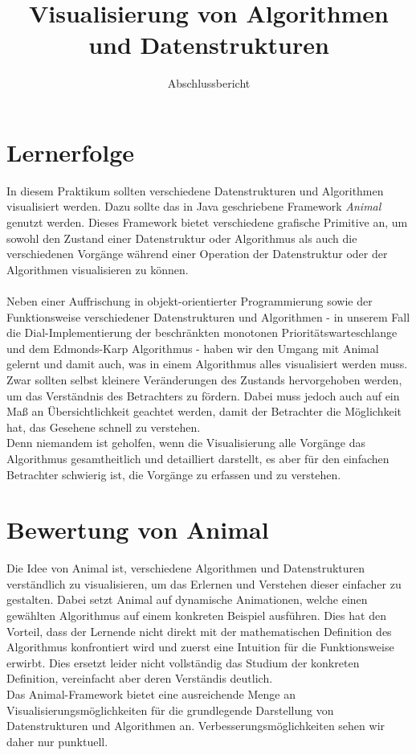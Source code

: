 \documentclass[nochapname]{tudexercise}
\title{Visualisierung von Algorithmen und Datenstrukturen}
\subtitle{Abschlussbericht}
\begin{document}
	\lstset{language=Java}
	\maketitle
	
	\section{Lernerfolge}
		In diesem Praktikum sollten verschiedene Datenstrukturen und Algorithmen visualisiert werden. Dazu sollte das in Java geschriebene Framework \textit{Animal} genutzt werden. Dieses Framework bietet verschiedene grafische Primitive an, um sowohl den Zustand einer Datenstruktur oder Algorithmus als auch die verschiedenen Vorgänge während einer Operation der Datenstruktur oder der Algorithmen visualisieren zu können.\\\\
		Neben einer Auffrischung in objekt-orientierter Programmierung sowie der Funktionsweise verschiedener Datenstrukturen und Algorithmen - in unserem Fall die Dial-Implementierung der beschränkten monotonen Prioritätswarteschlange und dem Edmonds-Karp Algorithmus - haben wir den Umgang mit Animal gelernt und damit auch, was in einem Algorithmus alles visualisiert werden muss. Zwar sollten selbst kleinere Veränderungen des Zustands hervorgehoben werden, um das Verständnis des Betrachters zu fördern. Dabei muss jedoch auch auf ein Maß an Übersichtlichkeit geachtet werden, damit der Betrachter die Möglichkeit hat, das Gesehene schnell zu verstehen.\\
		Denn niemandem ist geholfen, wenn die Visualisierung alle Vorgänge das Algorithmus gesamtheitlich und detailliert darstellt, es aber für den einfachen Betrachter schwierig ist, die Vorgänge zu erfassen und zu verstehen.
		
	\section{Bewertung von Animal}
		Die Idee von Animal ist, verschiedene Algorithmen und Datenstrukturen verständlich zu visualisieren, um das Erlernen und Verstehen dieser einfacher zu gestalten. Dabei setzt Animal auf dynamische Animationen, welche einen gewählten Algorithmus auf einem konkreten Beispiel ausführen. Dies hat den Vorteil, dass der Lernende nicht direkt mit der mathematischen Definition des Algorithmus konfrontiert wird und zuerst eine Intuition für die Funktionsweise erwirbt. Dies ersetzt leider nicht vollständig das Studium der konkreten Definition, vereinfacht aber deren Verständis deutlich.\\
		Das Animal-Framework bietet eine ausreichende Menge an Visualisierungsmöglichkeiten für die grundlegende Darstellung von Datenstrukturen und Algorithmen an. Verbesserungsmöglichkeiten sehen wir daher nur punktuell.
		
\end{document}
